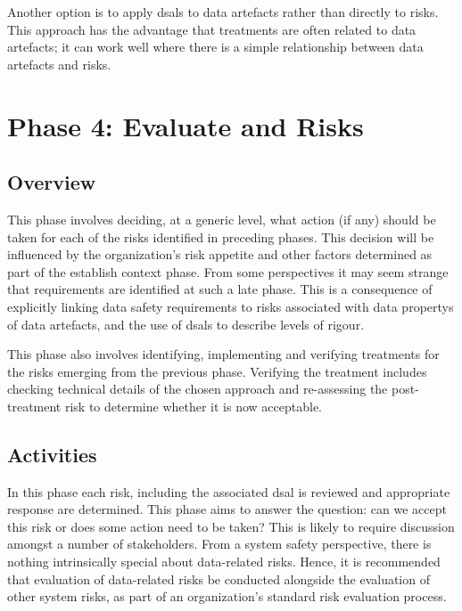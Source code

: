 Another option is to apply \glspl{dsal} to \glspl{data artefact} rather than directly to risks. This approach has the advantage that \glspl{treatment} are often related to \glspl{data artefact}; it can work well where there is a simple relationship between \glspl{data artefact} and risks.

\section{Phase 4: Evaluate and  Risks}
\subsection{Overview}
This phase involves deciding, at a generic level, what action (if any) should be taken for each of the risks identified in preceding phases. This decision will be influenced by the organization's risk appetite and other factors determined as part of the establish context phase. From some perspectives it may seem strange that requirements are identified at such a late phase. This is a consequence of explicitly linking data safety requirements to risks associated with \glspl{data property} of \glspl{data artefact}, and the use of \glspl{dsal} to describe levels of rigour. 

This phase also involves identifying, implementing and verifying \glspl{treatment} for the risks emerging from the previous phase. Verifying the \gls{treatment} includes checking technical details of the chosen approach and re-assessing the post-\gls{treatment} risk to determine whether it is now acceptable.

\subsection{Activities}
In this phase each risk, including the associated \gls{dsal} is reviewed and appropriate \gls{response} are determined. This phase aims to answer the question: can we accept this risk or does some action need to be taken? This is likely to require discussion amongst a number of \glspl{stakeholder}. From a system safety perspective, there is nothing intrinsically special about data-related risks. Hence, it is recommended that evaluation of data-related risks be conducted alongside the evaluation of other system risks, as part of an organization's standard risk evaluation process.

